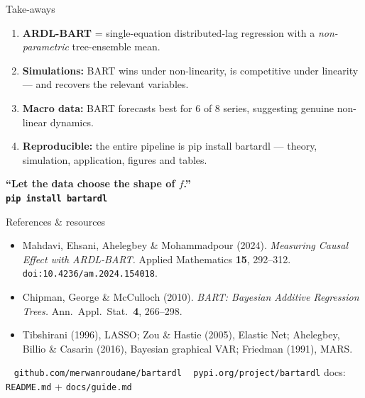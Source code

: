 \documentclass[11pt,aspectratio=169]{beamer}
\newcommand{\code}[1]{{\ttfamily\color{parIndigo}#1}}
\begin{document}
\begin{frame}{Take-aways}
  \begin{enumerate}
    \item[\textcolor{parTeal}{\faTree}] \textbf{ARDL-BART} = single-equation
      distributed-lag regression with a \emph{non-parametric} tree-ensemble mean.
    \item[\textcolor{parTeal}{\faChartBar}] \textbf{Simulations:} BART wins under
      non-linearity, is competitive under linearity --- and recovers the relevant
      variables.
    \item[\textcolor{parGold}{\faGlobe}] \textbf{Macro data:} BART forecasts best for
      6 of 8 series, suggesting genuine non-linear dynamics.
    \item[\textcolor{parGold}{\faLaptopCode}] \textbf{Reproducible:} the entire
      pipeline is \code{pip install bartardl} --- theory, simulation, application,
      figures and tables.
  \end{enumerate}
  \vspace{3mm}
  \begin{center}
  \begin{tcolorbox}[enhanced,colback=parIndigo,colframe=parIndigo,coltext=white,
     arc=3pt,width=0.9\linewidth,halign=center]
     \large\bfseries ``Let the data choose the shape of $f$.''\\[1mm]
     \normalsize\color{parGold}\texttt{pip install bartardl}
  \end{tcolorbox}
  \end{center}
\end{frame}

\begin{frame}{References \& resources}
  \small
  \begin{itemize}
    \item Mahdavi, Ehsani, Ahelegbey \& Mohammadpour (2024).
      \emph{Measuring Causal Effect with ARDL-BART.} Applied Mathematics
      \textbf{15}, 292--312. \texttt{doi:10.4236/am.2024.154018}.
    \item Chipman, George \& McCulloch (2010). \emph{BART: Bayesian Additive
      Regression Trees.} Ann.\ Appl.\ Stat.\ \textbf{4}, 266--298.
    \item Tibshirani (1996), LASSO; Zou \& Hastie (2005), Elastic Net;
      Ahelegbey, Billio \& Casarin (2016), Bayesian graphical VAR;
      Friedman (1991), MARS.
  \end{itemize}
  \vspace{3mm}
  \begin{exbox}[Package]
    \faGithub~ \texttt{github.com/merwanroudane/bartardl} \quad\textbullet\quad
    \faBox~ \texttt{pypi.org/project/bartardl} \quad\textbullet\quad
    docs: \texttt{README.md} + \texttt{docs/guide.md}
  \end{exbox}
  \vspace{2mm}
\end{frame}
\end{document}
